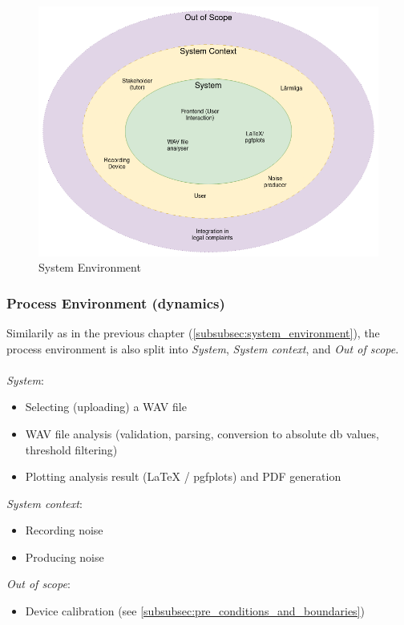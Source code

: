 \begin{figure}[H]
    \centering
    \includegraphics[width=\textwidth]{../assets/system_environment.png}
    \caption{System Environment}
\end{figure}

\subsubsection{Process Environment (dynamics)}
\label{subsubsec:process_environment}
Similarily as in the previous chapter (\ref{subsubsec:system_environment}), the process environment is also split into \textit{System}, \textit{System context}, and \textit{Out of scope}. \\ \\
\textit{System}:
\begin{itemize}
    \item Selecting (uploading) a WAV file
    \item WAV file analysis (validation, parsing, conversion to absolute db values, threshold filtering)
    \item Plotting analysis result (LaTeX / pgfplots) and PDF generation
\end{itemize}
\textit{System context}:
\begin{itemize}
    \item Recording noise
    \item Producing noise
\end{itemize}
\textit{Out of scope}:
\begin{itemize}
    \item Device calibration (see \ref{subsubsec:pre_conditions_and_boundaries})
\end{itemize}

